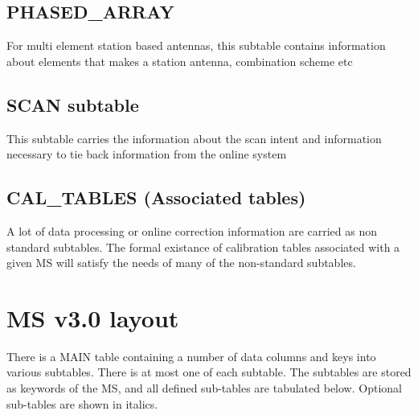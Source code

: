 \documentclass{article}
\begin{document}
\subsection{PHASED\_ARRAY}
For multi element station based antennas, this subtable contains information
about elements that makes a station antenna, combination scheme etc

\subsection{SCAN subtable}
This subtable carries the information about the scan intent and information
necessary to tie back information from the online system

\subsection{CAL\_TABLES (Associated tables)}
A lot of data processing or online correction information are carried as
non standard subtables. The formal existance of calibration tables associated
with a given MS will satisfy the needs of many of the non-standard subtables.


\section{MS v3.0 layout}

There is a MAIN table containing a number of data columns and keys
into various subtables. There is at most one of each subtable. The
subtables are stored as keywords of the MS, and all defined sub-tables
are tabulated below.  Optional sub-tables are shown in italics.
\end{document}
